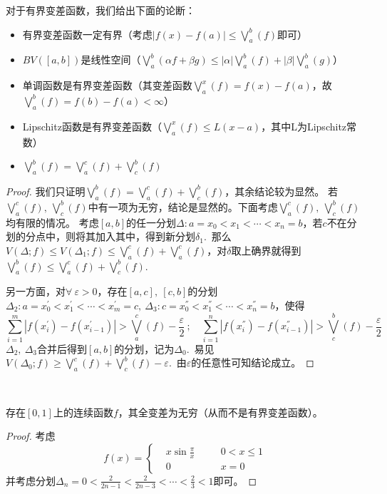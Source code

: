 \documentclass[color=green,thmcnt=section,lang=cn,12pt]{elegantbook}
\numberwithin{equation}{section}%
\numberwithin{figure}{section}%
\newcommand{\ee}{\varepsilon}
\newcommand{\any}{\forall \ }
\begin{document}
对于有界变差函数，我们给出下面的论断：
\begin{proposition}
    \begin{itemize}
        \item 有界变差函数一定有界（考虑$|f(x)-f(a)|\leq \bigvee_{a}^{b}(f)$即可）
        \item $BV([a,b])$是线性空间（$\bigvee_{a}^{b}(\alpha f+\beta g)\leq |\alpha|\bigvee_{a}^{b}(f)+|\beta|\bigvee_{a}^{b}(g)$）
        \item 单调函数是有界变差函数（其变差函数$\bigvee_a^x(f)=f(x)-f(a)$，故$\bigvee_{a}^{b}(f)=f(b)-f(a)<\infty$）
        \item Lipschitz函数是有界变差函数（$\bigvee_a^x(f)\leq L(x-a)$，其中L为Lipschitz常数）
        \item $\bigvee_{a}^{b}(f)=\bigvee_{a}^{c}(f)+\bigvee_{c}^{b}(f)$
    \end{itemize}
\end{proposition}
\begin{proof}
    我们只证明$\bigvee_{a}^{b}(f)=\bigvee_{a}^{c}(f)+\bigvee_{c}^{b}(f)$，其余结论较为显然。
    若$\bigvee_{a}^{c}(f),\ \bigvee_{c}^{b}(f)$中有一项为无穷，结论是显然的。下面考虑$\bigvee_{a}^{c}(f),\ \bigvee_{c}^{b}(f)$均有限的情况。
    考虑$[a,b]$的任一分划$\Delta:a=x_0<x_1<\cdots<x_n=b$，若$c$不在分划的分点中，则将其加入其中，得到新分划$\delta_1$.\ 
    那么$V(\Delta;f)\leq V(\Delta_1;f)\leq \bigvee_a^c(f)+\bigvee_a^c(f)$，对$\delta$取上确界就得到$\bigvee_{a}^{b}(f)\leq \bigvee_{a}^{c}(f)+\bigvee_{c}^{b}(f)$.\ 


    另一方面，对$\any\ee>0$，存在$[a,c],\ [c,b]$的分划$\Delta_2:a=x_0^{'}<x_1^{'}<\cdots<x_{m}^{'}=c,\ \Delta_3:c=x_0^{''}<x_1^{''}<\cdots<x_{n}^{''}=b$，使得\begin{equation*}
        \sum_{i=1}^{m}|f(x_i^{'})-f(x_{i-1}^{'})|>\bigvee_{a}^c(f)-\frac{\ee}{2}\ ;\quad \sum_{i=1}^{n}|f(x_i^{''})-f(x_{i-1}^{''})|>\bigvee_{c}^b(f)-\frac{\ee}{2}
    \end{equation*}
    $\Delta_2,\ \Delta_3$合并后得到$[a,b]$的分划，记为$\Delta_0$.\ 易见$V(\Delta_0;f)\geq \bigvee_{a}^{c}(f)+\bigvee_{c}^{b}(f)-\ee$.\ 由$\ee$的任意性可知结论成立。
\end{proof}
\ 


\begin{example}
    存在$[0,1]$上的连续函数$f$，其全变差为无穷（从而不是有界变差函数）。
\end{example}
\begin{proof}
    考虑\begin{equation*}
        f(x)=\left\{
            \begin{aligned}
                &x\sin \frac{\pi}{x}&\quad&0<x\leq 1\\
                &0 &\quad&x=0
            \end{aligned}
        \right.
    \end{equation*}
    并考虑分划$\Delta_n=0<\frac{2}{2n-1}<\frac{2}{2n-3}<\cdots<\frac{2}{3}<1$即可。
\end{proof}
\ 
\end{document}

